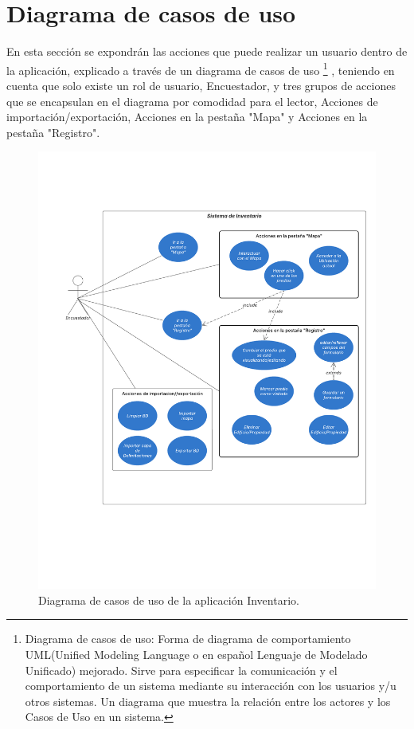\section{Diagrama de casos de uso}
En esta sección se expondrán las acciones que puede realizar un usuario dentro de la aplicación, explicado a través de un diagrama de casos de uso
\footnote{Diagrama de casos de uso: Forma de diagrama de comportamiento UML(Unified Modeling Language o en español Lenguaje de Modelado Unificado) mejorado. Sirve para
    especificar la comunicación y el comportamiento de un sistema mediante su interacción con los usuarios
    y/u otros sistemas. Un diagrama que muestra la relación entre los actores y los Casos de Uso en un
    sistema.}
, teniendo en cuenta que solo existe un rol de usuario, Encuestador,
y tres grupos de acciones que se encapsulan en el diagrama por comodidad para el lector, Acciones de importación/exportación, Acciones en la pestaña "Mapa" y Acciones en
la pestaña "Registro".
\pagebreak
\begin{figure}[h]
    \centering
    \includegraphics[scale=0.5]{Graphics/Capitulo 3/Diagrama_casos_de_uso.png}
    \caption{Diagrama de casos de uso de la aplicación Inventario.} %
    \label{fig:figura13}
\end{figure}
